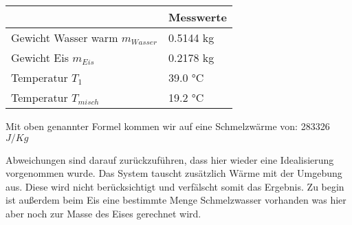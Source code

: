         \begin{table}[H]
            \centering
            \begin{tabular}{|l|l|}
                \hline
                 & Messwerte\\
                \hline
                Gewicht Wasser warm $m_{Wasser}$ & 0.5144 kg\\
                \hline
                Gewicht Eis $m_{Eis}$ &0.2178 kg\\
                \hline
                Temperatur $T_1$ & 39.0 °C \\
            \hline
            Temperatur $T_{misch}$ & 19.2 °C \\
            \hline
            \end{tabular}
        \end{table}
        Mit oben genannter Formel kommen wir auf eine Schmelzwärme von: 
        283326 $J/Kg$
        
		Abweichungen sind darauf
		zurückzuführen, dass hier wieder eine Idealisierung vorgenommen wurde.
		Das System tauscht zusätzlich Wärme mit der Umgebung aus. Diese wird
		nicht berücksichtigt und verfälscht somit das Ergebnis. Zu begin ist außerdem beim Eis eine bestimmte Menge Schmelzwasser vorhanden
		was hier aber noch zur Masse des Eises gerechnet wird.
